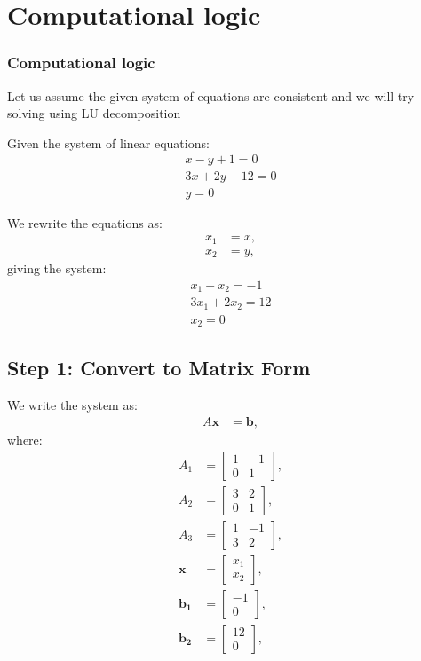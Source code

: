 \documentclass{beamer}
\theoremstyle{remark}
\numberwithin{equation}{section}
\begin{document}
\section{Computational logic}
\begin{frame}[fragile]
    \frametitle{Computational logic}
	Let us assume the given system of equations are consistent and we will try solving using LU decomposition
	
	Given the system of linear equations:
	\begin{align}
	x-y+1=0\\
    3x+2y-12=0\\
    y=0
	\end{align}
	
	We rewrite the equations as:
	\begin{align}
		x_1 &= x, \\
        		x_2 &= y,
	\end{align}
	giving the system:
	\begin{align}
	x_1-x_2=-1\\
    3x_1+2x_2=12\\
    x_2=0
	\end{align}
\end{frame}
\begin{frame}[fragile]
 	\subsection*{Step 1: Convert to Matrix Form}
	We write the system as:
	\begin{align}
		A \mathbf{x} &= \mathbf{b},
	\end{align}
	where:
	\begin{align}
A_1 &= \begin{bmatrix} 1 & -1 \\ 0 & 1 \end{bmatrix},\\
A_2 &= \begin{bmatrix} 3 & 2 \\ 0 & 1 \end{bmatrix},\\
A_3 &= \begin{bmatrix} 1 & -1 \\ 3 & 2 \end{bmatrix},\\
\mathbf{x} &= \begin{bmatrix} x_1 \\ x_2 \end{bmatrix}, \\
\mathbf{b_1} &= \begin{bmatrix} -1 \\ 0 \end{bmatrix},\\
\mathbf{b_2} &= \begin{bmatrix} 12 \\ 0 \end{bmatrix},
\end{align}
\end{frame}
\end{document}
